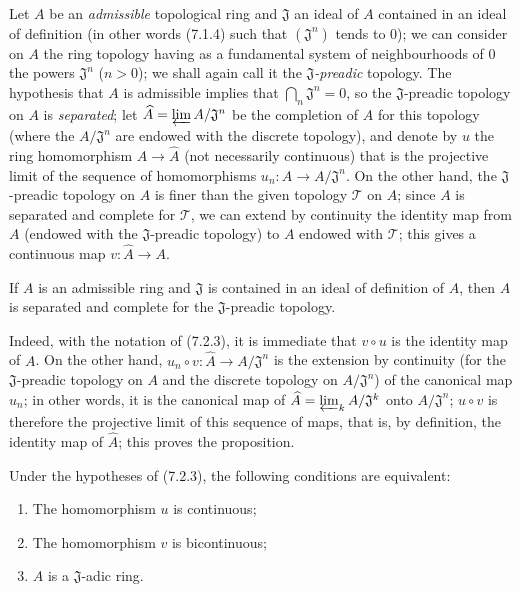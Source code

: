 \begin{env}[7.2.3]
\label{0.7.2.3}
Let $A$ be an \emph{admissible} topological ring and $\mathfrak J$ an ideal of $A$
contained in an ideal of definition (in other words (7.1.4) such that
$(\mathfrak J^n)$ tends to $0$); we can consider on $A$ the ring topology
having as a fundamental system of neighbourhoods of $0$ the powers
$\mathfrak J^n$ ($n>0$); we shall again call it the
\emph{$\mathfrak J$-preadic} topology. The hypothesis that $A$ is admissible implies that
$\bigcap_n\mathfrak J^n=0$, so the $\mathfrak J$-preadic topology on $A$
is \emph{separated}; let
$\widehat A=\varprojlim A/\mathfrak J^n$ be the completion of $A$ for this topology
(where the $A/\mathfrak J^n$ are endowed with the discrete topology), and denote
by $u$ the ring homomorphism $A\to\widehat A$ (not necessarily
continuous) that is the projective limit of the sequence of homomorphisms
$u_n:A\to A/\mathfrak J^n$. On the other hand, the $\mathfrak J$-preadic topology
on $A$ is finer than the given topology $\mathcal T$ on $A$; since $A$
is separated and complete for $\mathcal T$, we can extend by continuity
the identity map from $A$ (endowed with the $\mathfrak J$-preadic topology)
to $A$ endowed with $\mathcal T$; this gives a continuous map
$v:\widehat A\to A$.
\end{env}

\begin{proposition}[7.2.4]
\label{0.7.2.4}
If $A$ is an admissible ring and $\mathfrak J$ is contained in an ideal of
definition of $A$, then $A$ is separated and complete for the
$\mathfrak J$-preadic topology.
\end{proposition}

Indeed, with the notation of (7.2.3), it is immediate that $v\circ u$ is
the identity map of $A$. On the other hand,
$u_n\circ v:\widehat A\to A/\mathfrak J^n$ is the extension by continuity
(for the $\mathfrak J$-preadic topology on $A$ and the discrete topology on
$A/\mathfrak J^n$) of the canonical map $u_n$; in other words, it is
the canonical map of
$\widehat A=\varprojlim_k A/\mathfrak J^k$ onto $A/\mathfrak J^n$;
$u\circ v$ is therefore the projective limit of this sequence of maps,
that is, by definition, the identity map of $\widehat A$; this
proves the proposition.

\begin{corollary}[7.2.5]
\label{0.7.2.5}
Under the hypotheses of (7.2.3), the following conditions are equivalent:
\begin{enumerate}
  \item[{\upshape a)}] The homomorphism $u$ is continuous;


  \item[{\upshape b)}] The homomorphism $v$ is bicontinuous;
  \item[{\upshape c)}] $A$ is a $\mathfrak J$-adic ring.
\end{enumerate}
\end{corollary}

